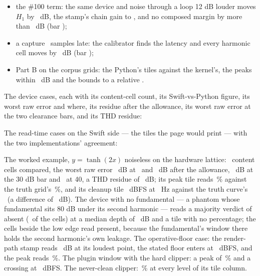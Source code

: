 \documentclass[11pt,a4paper]{article}
\begin{document}
{\begin{itemize}
  cleanup tile always clean, and no cell in the loudest row quoted clear;
  \item the \#100 term: the same device and noise through a loop 12 dB
  louder moves $H_1$ by \jparityGainShift\ dB, the stamp's chain gain to
  \jparityGainStamp, and no composed margin by more than
  \jparityGainMarginMove\ dB (bar \jparityGainInvariance);
  \item a capture \jparityLatencyFound\ samples late: the calibrator finds
  the latency and every harmonic cell moves by \jparityLatencyMove\ dB
  (bar \jparityLatency);
  \item Part B on the corpus grids: the Python's tiles against the
  kernel's, the peaks within \jparityCorpusPeak\ dB and the bounds to a
  relative \jparityCorpusBound.
\end{itemize}
\par}
\jparityPartBStatus

The device cases, each with its content-cell count, its Swift-vs-Python
figure, its worst raw error and where, its residue after the allowance,
its worst raw error at the two clearance bars, and its THD residue:

\begin{center}\scriptsize\setlength{\tabcolsep}{3pt}\jparityDeviceTable\end{center}

The read-time cases on the Swift side --- the tiles the page would print
--- with the two implementations' agreement:

\begin{center}\scriptsize\setlength{\tabcolsep}{3pt}\jparityReadTimeTable\end{center}

The worked example, $y = \tanh(2x)$ noiseless on the hardware lattice:
\jparityWorkedContent\ content cells compared, the worst raw error
\jparityWorkedRaw\ dB at \jparityWorkedRawAt\ and \jparityWorkedResidue\ dB
after the allowance, \jparityWorkedThirty\ dB at the 30 dB bar and
\jparityWorkedForty\ at 40, a THD residue of \jparityWorkedTHDResidue\ dB;
its peak tile reads \jparityWorkedPeak\,\% against the truth grid's
\jparityWorkedTruthPeak\,\%, and its cleanup tile \jparityWorkedCleanup\
dBFS at \jparityWorkedCleanupColumnHz\ Hz against the truth curve's
\jparityWorkedTruthCleanup\ (a difference of \jparityWorkedCleanupError\
dB). The device with no fundamental --- a phantom whose fundamental sits
80 dB under its second harmonic --- reads a majority verdict of absent
(\jparityAbsentFraction\ of the cells) at a median depth of
\jparityAbsentDepth\ dB and a tile with no percentage; the cells beside the
low edge read present, because the fundamental's window there holds the
second harmonic's own leakage. The operative-floor case: the render-path
stamp reads \jparityOperativeStampFloor\ dB at its loudest point, the
stated floor enters at \jparityOperativeAbsolute\ dBFS, and the peak reads
\jparityOperativePeak\,\%. The plugin window with the hard clipper: a peak
of \jparityPluginPeak\,\% and a crossing at \jparityPluginCleanup\ dBFS.
The never-clean clipper: \jparityNeverCleanPeak\,\% at every level of its
tile column.
\end{document}
